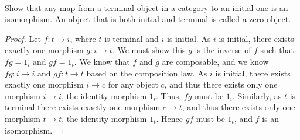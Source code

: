 \documentclass[../../main]{subfiles}
\begin{document}
\paragraph{}
\begin{exercise}
	Show that any map from a terminal object in a category to an initial one is
	an isomorphism.  An object that is both initial and terminal is called a
	zero object.
\end{exercise}

\begin{proof}
	Let $f\colon t \rightarrow i$, where $t$ is terminal and $i$ is initial. As
	$i$ is initial, there exists exactly one morphism $g\colon i \rightarrow t$.
	We must show this $g$ is the inverse of $f$ such that $fg = 1_i$ and $gf =
	1_t$. We know that $f$ and $g$ are composable, and we know $fg\colon i
	\rightarrow i$ and $gf\colon t \rightarrow t$ based on the composition law.
	As $i$ is initial, there exists exactly one morphism $i \rightarrow c$ for
	any object $c$, and thus there exists only one morphism $i \rightarrow i$,
	the identity morphism $1_i$. Thus, $fg$ must be $1_i$. Similarly, as $t$
	is terminal there exists exactly one morphism $c \rightarrow t$, and thus
	there exists only one morphism $t \rightarrow t$, the identity morphism
	$1_t$. Hence $gf$ must be $1_t$, and $f$ is an isomorphism.
\end{proof}
\end{document}
